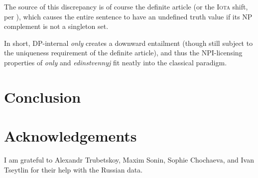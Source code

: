 \documentclass{article}
\begin{document}
The source of this discrepancy is of course the definite article (or the \textsc{Iota} shift, per \citeauthor{cb2015}), which causes the entire sentence to have an undefined truth value if its NP complement is not a singleton set.

In short, DP-internal \textit{only} creates a downward entailment (though still subject to the uniqueness requirement of the definite article), and thus the NPI-licensing properties of \textit{only} and \textit{edinstvennyj} fit neatly into the classical paradigm.


\section{Conclusion \label{sec:conclusion}}


\section*{Acknowledgements}
I am grateful to Alexandr Trubetskoy, Maxim Sonin, Sophie Chochaeva, and Ivan Tseytlin for their help with the Russian data.


\end{document}

